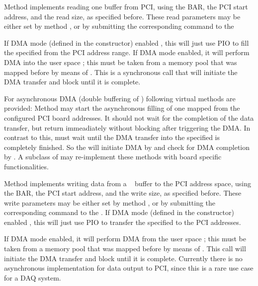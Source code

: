 \begin{compactenum}
\item {}
Method  
implements reading one buffer from PCI, using the BAR,
the PCI start address, and the read size, as specified before.
These read parameters may be either set by method 
,
or by submitting the corresponding command  to 
the 
    
If DMA mode (defined in the constructor)  enabled , 
this will just use PIO to fill the specified 
 from the PCI address range.
If DMA mode  enabled, it will
perform DMA into the user space ; this must be taken from a memory pool
that was mapped before by means of .
This is a synchronous call that will initiate the DMA transfer 
and block until it is complete.
 
For asynchronous DMA (double buffering of ) 
following virtual methods are provided:
Method  may start 
the asynchronous filling of one mapped  from the configured PCI 
board addresses. It should not wait for the completion of the data transfer, but
return immeadiately without blocking after triggering the DMA. In contrast to this,
 must 
wait until the DMA transfer into the specified  is completely
finished. So the  will initiate DMA 
by  and
check for DMA completion by .
A subclass of 
may re-implement these methods with board specific functionalities.


\item {}
Method  
implements writing data from a \dabc~ buffer to the PCI address space, 
using the BAR, the PCI start address, and the write size, as specified before.
These write parameters may be either set by method 
,
or by submitting the corresponding command  to 
the .
If DMA mode (defined in the constructor)  enabled , 
this will just use PIO to transfer the specified 
 to the PCI addresses.

If DMA mode  enabled, it will
perform DMA from the user space ; this must be taken from a memory pool
that was mapped before by means of . 
This call will initiate the DMA transfer and block until it is complete.
Currently there is no asynchronous implementation for data output to PCI,
since this is a rare use case for a DAQ system.


\end{compactenum} 


